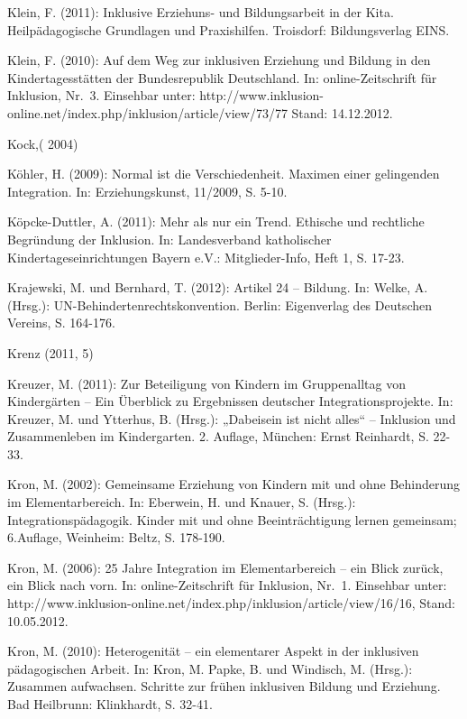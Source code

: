 Klein, F. (2011): Inklusive Erziehuns- und Bildungsarbeit in der Kita. Heilpädagogische Grundlagen und Praxishilfen. Troisdorf: Bildungsverlag EINS.

Klein, F. (2010): Auf dem Weg zur inklusiven Erziehung und Bildung in den Kindertagesstätten der Bundesrepublik Deutschland. In: online-Zeitschrift für Inklusion, Nr.~3. Einsehbar unter: http://www.inklusion-online.net/index.php/inklusion/article/view/73/77 Stand: 14.12.2012.  


Kock,( 2004)

Köhler, H. (2009): Normal ist die Verschiedenheit. Maximen einer gelingenden Integration. In: Erziehungskunst, 11/2009, S. 5-10.

Köpcke-Duttler, A. (2011): Mehr als nur ein Trend. Ethische und rechtliche Begründung der Inklusion. In: Landesverband katholischer Kindertageseinrichtungen Bayern e.V.: Mitglieder-Info, Heft 1, S. 17-23.

Krajewski, M. und Bernhard, T. (2012): Artikel 24 -- Bildung. In: Welke, A. (Hrsg.): UN-Behindertenrechtskonvention. Berlin: Eigenverlag des Deutschen Vereins, S. 164-176.

Krenz (2011, 5)

Kreuzer, M. (2011): Zur Beteiligung von Kindern im Gruppenalltag von Kindergärten – Ein Überblick zu Ergebnissen deutscher Integrationsprojekte. In: Kreuzer, M. und Ytterhus, B. (Hrsg.): „Dabeisein ist nicht alles“ – Inklusion und Zusammenleben im Kindergarten. 2. Auflage, München: Ernst Reinhardt, S. 22-33.

Kron, M. (2002): Gemeinsame Erziehung von Kindern mit und ohne Behinderung im Elementarbereich. In: Eberwein, H. und Knauer, S. (Hrsg.): Integrationspädagogik. Kinder mit und ohne Beeinträchtigung lernen gemeinsam; 6.Auflage, Weinheim: Beltz, S. 178-190. 

Kron, M. (2006): 25 Jahre Integration im Elementarbereich – ein Blick zurück, ein Blick nach vorn. In: online-Zeitschrift für Inklusion, Nr.~1. Einsehbar unter: http://www.inklusion-online.net/index.php/inklusion/article/view/16/16, Stand: 10.05.2012.

Kron, M. (2010): Heterogenität – ein elementarer Aspekt in der inklusiven pädagogischen Arbeit. In: Kron, M. Papke, B. und Windisch, M. (Hrsg.): Zusammen aufwachsen. Schritte zur frühen inklusiven Bildung und Erziehung. Bad Heilbrunn: Klinkhardt, S. 32-41.

